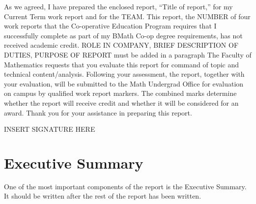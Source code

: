 \documentclass[12pt]{article}
\newcommand{\term}{Current Term } %
\newcommand{\WTT}{Title of report}
\begin{document}




\FirstPage

\newpage




\LetterHead



As we agreed, I have prepared the enclosed report, “\WTT,” for
my \term work report and for the TEAM. This
report, the NUMBER of four work reports that the Co-operative Education Program
requires that I successfully complete as part of my BMath Co-op degree
requirements, has not received academic credit.
\vskip 10pt
ROLE IN COMPANY, BRIEF DESCRIPTION OF DUTIES, PURPOSE OF REPORT must be added in a paragraph
\vskip 10pt 
The Faculty of Mathematics requests that you evaluate this report for command
of topic and technical content/analysis. Following your assessment, the report,
together with your evaluation, will be submitted to the Math Undergrad Office
for evaluation on campus by qualified work report markers. The combined
marks determine whether the report will receive credit and whether it will be
considered for an award.
Thank you for your assistance in preparing this report.

INSERT SIGNATURE HERE





\toc 



\section*{Executive Summary}



One of the most important components of the report is the Executive Summary. It should be written after the rest of the report has been written.
\end{document}
